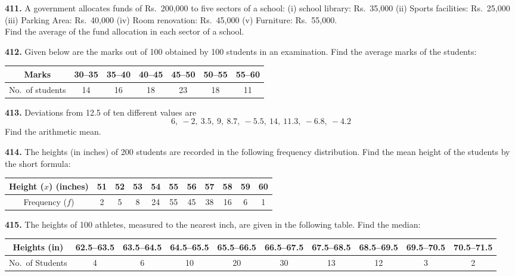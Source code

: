 \documentclass[11pt]{article}
\begin{document}
\noindent\textbf{411.} A government allocates funds of Rs.~200{,}000 to five sectors of a school:
(i) school library: Rs.~35{,}000 \quad (ii) Sports facilities: Rs.~25{,}000 \quad (iii) Parking Area: Rs.~40{,}000 \quad (iv) Room renovation: Rs.~45{,}000 \quad (v) Furniture: Rs.~55{,}000. \\
Find the average of the fund allocation in each sector of a school.

\bigskip
\noindent\textbf{412.} Given below are the marks out of 100 obtained by 100 students in an examination. Find the average marks of the students:

\begin{center}
\begin{tabular}{|c|c|c|c|c|c|c|}
\hline
Marks & 30--35 & 35--40 & 40--45 & 45--50 & 50--55 & 55--60 \\
\hline
No.\ of students & 14 & 16 & 18 & 23 & 18 & 11 \\
\hline
\end{tabular}
\end{center}

\bigskip
\noindent\textbf{413.} Deviations from 12.5 of ten different values are
\[
6,\ -2,\ 3.5,\ 9,\ 8.7,\ -5.5,\ 14,\ 11.3,\ -6.8,\ -4.2
\]
Find the arithmetic mean.

\bigskip
\noindent\textbf{414.} The heights (in inches) of 200 students are recorded in the following frequency distribution. Find the mean height of the students by the short formula:

\begin{center}
\begin{tabular}{|c|c|c|c|c|c|c|c|c|c|c|}
\hline
Height ($x$) (inches) & 51 & 52 & 53 & 54 & 55 & 56 & 57 & 58 & 59 & 60 \\
\hline
Frequency ($f$) & 2 & 5 & 8 & 24 & 55 & 45 & 38 & 16 & 6 & 1 \\
\hline
\end{tabular}
\end{center}

\bigskip
\noindent\textbf{415.} The heights of 100 athletes, measured to the nearest inch, are given in the following table. Find the median:

\begin{center}
\begin{tabular}{|c|c|c|c|c|c|c|c|c|c|}
\hline
Heights (in) & 62.5--63.5 & 63.5--64.5 & 64.5--65.5 & 65.5--66.5 & 66.5--67.5 & 67.5--68.5 & 68.5--69.5 & 69.5--70.5 & 70.5--71.5 \\
\hline
No.\ of Students & 4 & 6 & 10 & 20 & 30 & 13 & 12 & 3 & 2 \\
\hline
\end{tabular}
\end{center}
\end{document}
